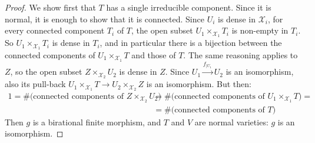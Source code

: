 \documentclass[11pt]{amsart}
\newcommand{\sX}{\mathscr{X}}
\theoremstyle{definition}
\begin{document}
\begin{proof}
 We show first that $T$ has a single irreducible component. Since it is normal, it is enough to show that it is connected.
 Since $U_i$ is dense in $\sX_i$, for every connected component $T_i$ of $T$, the open subset $U_1 \times_{\sX_1}T_i$ is
 non-empty in $T_i$. So $U_1 \times_{\sX_1}T_i$ is dense in $T_i$, and in particular there is a bijection
 between the connected components of $U_1\times_{\sX_1}T$ and those of $T$. The same reasoning applies to $Z$, so the open subset $Z \times_{\sX_2}U_2$ is
 dense in $Z$.
 Since $U_1 \xrightarrow{f_{|U_1}} U_2$ is an isomorphism, also its pull-back
 $U_1 \times_{\sX_1} T \to U_2\times_{\sX_2} Z$ is an isomorphism. But then:
 \begin{align*}
  1=\# \text{(connected components of }Z\times_{\sX_2}U_2)&=\# \text{(connected components of }U_1 \times_{\sX_1} T)=\\
  &=\# \text{(connected components of }T)
 \end{align*}
Then $g$ is a birational finite morphism, and $T$ and $V$ are normal varieties: $g$ is an isomorphism.
 \end{proof}
 
\end{document}
